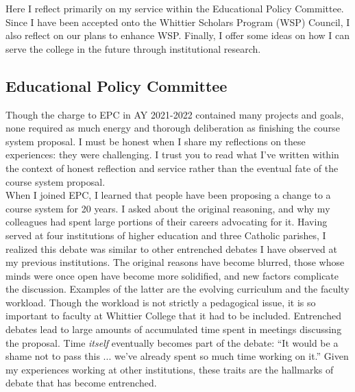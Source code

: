 \documentclass[../../../main.tex]{subfiles}
\begin{document}
\label{sec:committee_service}

Here I reflect primarily on my service within the Educational Policy Committee.  Since I have been accepted onto the Whittier Scholars Program (WSP) Council, I also reflect on our plans to enhance WSP.  Finally, I offer some ideas on how I can serve the college in the future through institutional research.

\subsection{Educational Policy Committee}

Though the charge to EPC in AY 2021-2022 contained many projects and goals, none required as much energy and thorough deliberation as finishing the course system proposal.  I must be honest when I share my reflections on these experiences: they were challenging.  I trust you to read what I've written within the context of honest reflection and service rather than the eventual fate of the course system proposal.
\\
\vspace{0.25cm}
When I joined EPC, I learned that people have been proposing a change to a course system for 20 years.  I asked about the original reasoning, and why my colleagues had spent large portions of their careers advocating for it.  Having served at four institutions of higher education and three Catholic parishes, I realized this debate was similar to other entrenched debates I have observed at my previous institutions.  The original reasons have become blurred, those whose minds were once open have become more solidified, and new factors complicate the discussion.  Examples of the latter are the evolving curriculum and the faculty workload.  Though the workload is not strictly a pedagogical issue, it is so important to faculty at Whittier College that it had to be included.  Entrenched debates lead to large amounts of accumulated time spent in meetings discussing the proposal.  Time \textit{itself} eventually becomes part of the debate: ``It would be a shame not to pass this ... we've already spent so much time working on it.''  Given my experiences working at other institutions, these traits are the hallmarks of debate that has become entrenched.
\\
\vspace{0.25cm}
\end{document}
